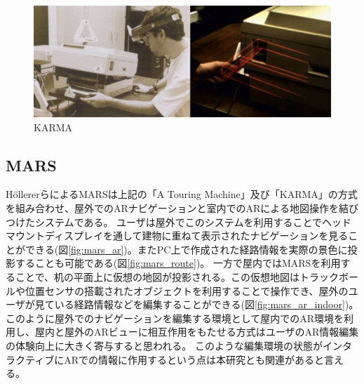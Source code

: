 \begin{figure}[h]
  \centering
  \includegraphics[width=150mm]{images/karma.jpg}
  \caption{KARMA} \label{fig:karma}
\end{figure}


\subsection{MARS}
HöllererらによるMARS\cite{MARS}は上記の「A Touring Machine」及び「KARMA」の方式を組み合わせ、屋外でのARナビゲーションと室内でのARによる地図操作を結びつけたシステムである。
ユーザは屋外でこのシステムを利用することでヘッドマウントディスプレイを通して建物に重ねて表示されたナビゲーションを見ることができる(図\ref{fig:mars_ar})。またPC上で作成された経路情報を実際の景色に投影することも可能である(図\ref{fig:mars_route})。
一方で屋内ではMARSを利用することで、机の平面上に仮想の地図が投影される。この仮想地図はトラックボールや位置センサの搭載されたオブジェクトを利用することで操作でき、屋外のユーザが見ている経路情報などを編集することができる(図\ref{fig:mars_ar_indoor})。
このように屋外でのナビゲーションを編集する環境として屋内でのAR環境を利用し、屋内と屋外のARビューに相互作用をもたせる方式はユーザのAR情報編集の体験向上に大きく寄与すると思われる。
このような編集環境の状態がインタラクティブにARでの情報に作用するという点は本研究とも関連があると言える。

